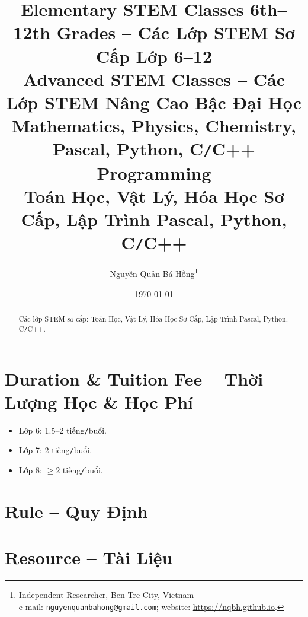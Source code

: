 \documentclass{article}
\title{Elementary STEM Classes 6th--12th Grades -- Các Lớp STEM Sơ Cấp Lớp 6--12\\Advanced STEM Classes -- Các Lớp STEM Nâng Cao Bậc Đại Học\\\vspace{5mm}Mathematics, Physics, Chemistry, Pascal, Python, C{\tt/}C++ Programming\\Toán Học, Vật Lý, Hóa Học Sơ Cấp, Lập Trình Pascal, Python, C{\tt/}C++}
\author{Nguyễn Quản Bá Hồng\footnote{Independent Researcher, Ben Tre City, Vietnam\\e-mail: \texttt{nguyenquanbahong@gmail.com}; website: \url{https://nqbh.github.io}.}}
\date{\today}
\numberwithin{equation}{section}
\begin{document}
\maketitle
\begin{abstract}
	Các lớp STEM sơ cấp: Toán Học, Vật Lý, Hóa Học Sơ Cấp, Lập Trình Pascal, Python, C{\tt/}C++.
\end{abstract}
\setcounter{secnumdepth}{4}
\setcounter{tocdepth}{3}
\tableofcontents


\section{Duration \& Tuition Fee -- Thời Lượng Học \& Học Phí}

\begin{itemize}
	\item Lớp 6: 1.5--2 tiếng{\tt/}buổi.
	\item Lớp 7: 2 tiếng{\tt/}buổi.
	\item Lớp 8: $\ge2$ tiếng{\tt/}buổi.
\end{itemize}


\section{Rule -- Quy Định}


\section{Resource -- Tài Liệu}


\printbibliography[heading=bibintoc]
	
\end{document}
